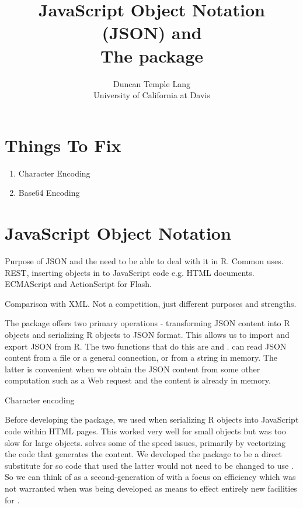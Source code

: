 \documentclass[article]{jss}
\author{Duncan Temple Lang \\
  University of California at Davis}
\title{JavaScript Object Notation (JSON) and \proglang{R}
\\
The \OmgPackage{RJSONIO} package}
\begin{document}
\section{Things To Fix}


\begin{enumerate}
\item{}Character Encoding

\item{}Base64 Encoding

\end{enumerate}


\section{JavaScript Object Notation}

Purpose  of JSON and the need to be able to deal with it in R.
Common uses.
REST, inserting objects in to JavaScript code e.g. HTML documents.
ECMAScript and ActionScript for Flash.

Comparison with XML.
Not a competition, just different purposes and strengths.

 The 
package offers two primary operations - transforming JSON content into
R objects and serializing R objects to JSON format.  This allows us to
import and export JSON from R.  The two functions that do this are
 and .
 can read JSON content
from a file or a general connection, or from a string in memory.
The latter is convenient when we obtain the JSON content
from some other computation such as a Web request and the content
is already in memory.

Character encoding

Before developing the  package, we used 
\citep{bib:rjson} when
serializing R objects into JavaScript code within HTML pages.  This
worked very well for small objects but was too slow for large objects.
 solves some of the speed issues, primarily
by vectorizing the code that generates the content.  We developed the
 package to be a direct substitute for
 so code that used the latter would not need to be
changed to use . So we can think of
 as a second-generation of
 with a focus on efficiency which was not
warranted when  was being developed as means to
effect entirely new facilities for .
\end{document}
